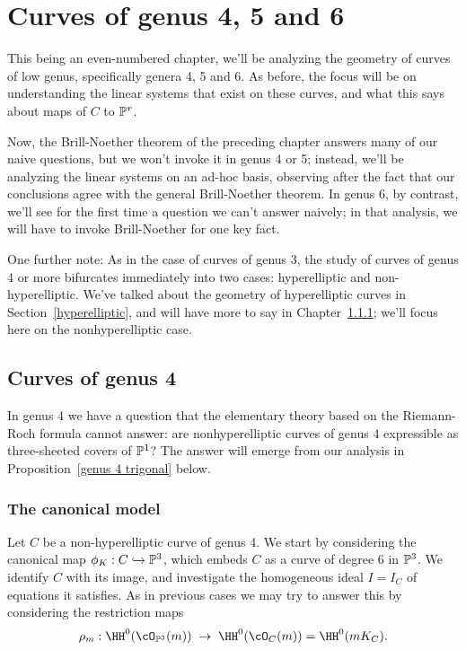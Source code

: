 

\chapter{Curves of genus 4, 5 and 6}\label{genus 4, 5 and 6 chapter}

This being an even-numbered chapter, we'll be analyzing the geometry of curves of low genus, specifically genera 4, 5 and 6. As before, the focus will be on understanding the linear systems that exist on these curves, and what this says about maps of $C$ to $\PP^r$. 

Now, the Brill-Noether theorem of the preceding chapter answers many of our naive questions, but we won't invoke it in genus 4 or 5; instead, we'll be analyzing the linear systems on an ad-hoc basis, observing after the fact that our conclusions agree with the general Brill-Noether theorem. In genus 6, by contrast, we'll see for the first time a question we can't answer naively; in that analysis, we will have to invoke Brill-Noether for one key fact.

One further note: As in the case of curves of genus 3, the study of curves of genus 4 or more bifurcates immediately into two cases: hyperelliptic and non-hyperelliptic. We've talked about the geometry of hyperelliptic curves in Section~\ref{hyperelliptic}, and will have more to say in Chapter~\ref{}; we'll focus here on the nonhyperelliptic case.


\section{Curves of genus 4}


In genus 4 we have a question that the elementary theory based on the Riemann-Roch formula cannot answer: are nonhyperelliptic curves of genus 4 expressible as three-sheeted covers of $\PP^1$? The answer will emerge from our analysis in Proposition~\ref{genus 4 trigonal} below.

\subsection{The canonical model}

Let $C$ be a non-hyperelliptic curve of genus 4. We start by considering the canonical map $\phi_K : C \hookrightarrow \PP^3$, which embeds $C$ as a curve of degree 6 in $\PP^3$. We identify $C$ with its image, and investigate the homogeneous ideal $I = I_C$ of equations it satisfies. As in previous cases we may try to answer this by considering the restriction maps
$$
\rho_m : \HH^0(\cO_{\PP^3}(m)) \; \to \; \HH^0(\cO_{C}(m)) = \HH^0(mK_C).
$$

